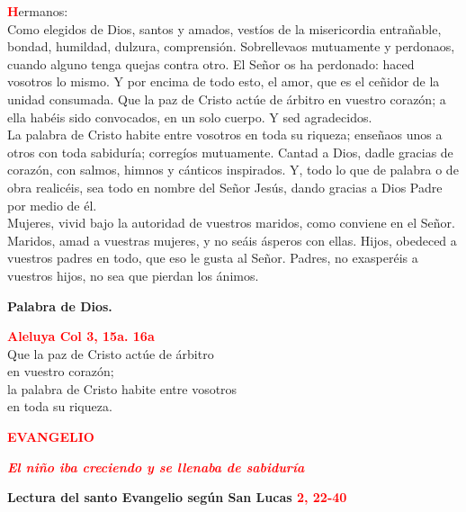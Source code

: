 \documentclass[12pt, letterpaper]{report}
\begin{document}
\lettrine[lines=1]{\bfseries \textcolor{red}{H}}{}\Large ermanos:\\
Como elegidos de Dios, santos y amados, vest\'ios de la misericordia entra\~nable, bondad, humildad, dulzura, comprensi\'on. Sobrellevaos mutuamente y perdonaos, cuando alguno tenga quejas contra otro. El Se\~nor os ha perdonado: haced vosotros lo mismo. Y por encima de todo esto, el amor, que es el ce\~nidor de la unidad consumada. Que la paz de Cristo act\'ue de \'arbitro en vuestro coraz\'on; a ella hab\'eis sido convocados, en un solo cuerpo. Y sed agradecidos.\\
La palabra de Cristo habite entre vosotros en toda su riqueza; ense\~naos unos a otros con toda sabidur\'ia; correg\'ios mutuamente. Cantad a Dios, dadle gracias de coraz\'on, con salmos, himnos y c\'anticos inspirados. Y, todo lo que de palabra o de obra realic\'eis, sea todo en nombre del Se\~nor Jes\'us, dando gracias a Dios Padre por medio de \'el. \\
Mujeres, vivid bajo la autoridad de vuestros maridos, como conviene en el Se\~nor. Maridos, amad a vuestras mujeres, y no se\'ais \'asperos con ellas. Hijos, obedeced a vuestros padres en todo, que eso le gusta al Se\~nor. Padres, no exasper\'eis a vuestros hijos, no sea que pierdan los \'animos.

{\bfseries Palabra de Dios.}


\begin{center}
\Large {\bfseries \textcolor{red}{Aleluya \hspace{1cm} Col 3, 15a. 16a}}\\
Que la paz de Cristo act\'ue de \'arbitro\\ 
en vuestro coraz\'on;\\
la palabra de Cristo habite entre vosotros\\
en toda su riqueza.
\end{center}

\newpage

\begin{center}
\Large {\bfseries \textcolor{red}{EVANGELIO}}
\end{center}

\begin{center}
\large {\bfseries \textit{ \textcolor{red}{El ni\~no iba creciendo y se llenaba de sabidur\'ia}}}
\end{center}

\Huge \textcolor{red}{} \Large {\bfseries Lectura del santo Evangelio seg\'un San Lucas \hspace{1cm} \textcolor{red}{2, 22-40}}
\end{document}
